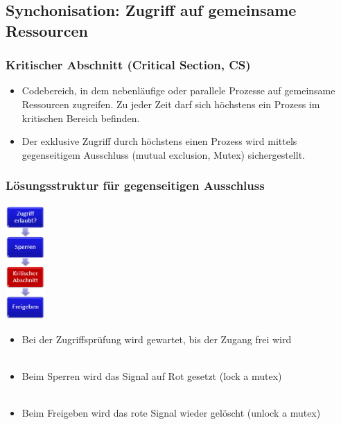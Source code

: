 \subsection{Synchonisation: Zugriff auf gemeinsame Ressourcen}
\subsubsection{Kritischer Abschnitt (Critical Section, CS)}
\begin{itemize}
  \item Codebereich, in dem nebenläufige oder parallele Prozesse auf gemeinsame Ressourcen zugreifen. Zu jeder Zeit darf sich höchstens ein Prozess im kritischen Bereich
  befinden.
  \item Der exklusive Zugriff durch höchstens einen Prozess wird mittels gegenseitigem Ausschluss (mutual exclusion, Mutex) sichergestellt.
\end{itemize}

\subsubsection{Lösungsstruktur für gegenseitigen Ausschluss}
\begin{minipage}[c]{2cm}
  \includegraphics[width=1.5cm]{images/Concurrency/Loesungsstruktur.png}
\end{minipage}
\begin{minipage}[c]{14cm}
  \begin{itemize}
    \item Bei der Zugriffsprüfung wird gewartet, bis der Zugang frei wird \\ \ \\
    \item Beim Sperren wird das Signal auf Rot gesetzt (lock a mutex) \\ \ \\
    \item Beim Freigeben wird das rote Signal wieder gelöscht (unlock a mutex)
  \end{itemize}
\end{minipage}

